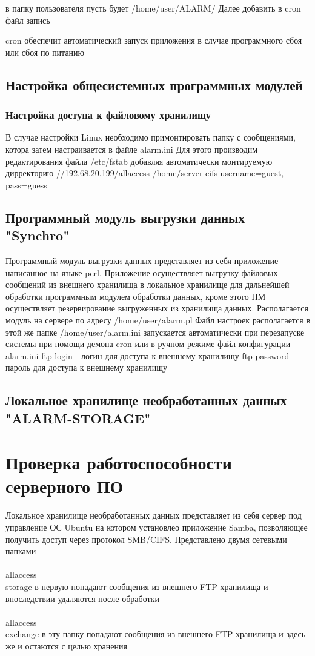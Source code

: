 \documentclass[12pt]{article}[a4paper,14pt,russian]
\begin{document}
	в папку пользователя пусть будет /home/user/ALARM/
	Далее добавить в cron файл запись 

	cron обеспечит автоматический запуск приложения в случае программного сбоя или сбоя по питанию
	\subsection{Настройка общесистемных программных модулей}

	\subsubsection{Настройка доступа к файловому хранилищу}
	В случае настройки Linux необходимо примонтировать папку с сообщениями, котора затем настраивается в файле alarm.ini
	Для этого производим редактирования файла /etc/fstab добавляя автоматически монтируемую дирректорию
	//192.68.20.199/allaccess /home/server cifs username=guest, pass=guess
	\subsection{Программный модуль выгрузки данных "Synchro"}
	Программный модуль выгрузки данных представляет из себя приложение написанное на языке perl. Приложение осуществляет выгрузку файловых сообщений из внешнего хранилища в локальное хранилище для дальнейшей обработки программным модулем обработки данных, кроме этого ПМ осуществляет резервирование выгруженных из хранилища данных.
	Располагается модуль на сервере по адресу
	/home/user/alarm.pl
	Файл настроек располагается в этой же папке 
	/home/user/alarm.ini
	запускается автоматически при перезапуске системы при помощи демона cron или в ручном режиме
	 \newline
    \newline
   файл конфигурации alarm.ini
    ftp-login - логин для доступа к внешнему хранилищу
    ftp-password - пароль для доступа к внешнему хранилищу
	\subsection{Локальное хранилище необработанных данных "ALARM-STORAGE"}
	\section{Проверка работоспособности серверного ПО}
	Локальное хранилище необработанных данных представляет из себя сервер под управление ОС Ubuntu на котором установлео приложение Samba, позволяющее  получить доступ через протокол SMB/CIFS. Представлено двумя сетевыми папками
	\\<ip адрес сервера>\\allaccess\\storage
	в первую попадают сообщения из внешнего FTP хранилища и впоследствии удаляются после обработки
	\\<ip адрес сервера>\\allaccess\\exchange
	в эту папку попадают сообщения из внешнего FTP хранилища и здесь же и остаются
	с целью хранения
\end{document}
